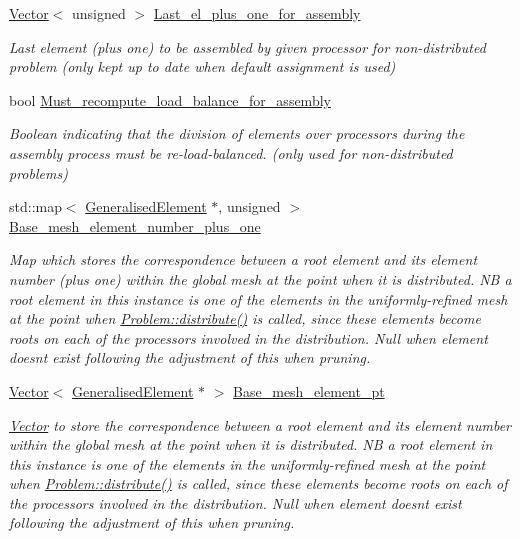 \begin{DoxyCompactItemize}
\hyperlink{classoomph_1_1Vector}{Vector}$<$ unsigned $>$ \hyperlink{classoomph_1_1Problem_a4842a9a213197905b5a8e182a3c02cce}{Last\+\_\+el\+\_\+plus\+\_\+one\+\_\+for\+\_\+assembly}
\begin{DoxyCompactList}\small\item\em Last element (plus one) to be assembled by given processor for non-\/distributed problem (only kept up to date when default assignment is used) \end{DoxyCompactList}\item 
bool \hyperlink{classoomph_1_1Problem_aab187e716f470b32a01d7f0cee7f3bf4}{Must\+\_\+recompute\+\_\+load\+\_\+balance\+\_\+for\+\_\+assembly}
\begin{DoxyCompactList}\small\item\em Boolean indicating that the division of elements over processors during the assembly process must be re-\/load-\/balanced. (only used for non-\/distributed problems) \end{DoxyCompactList}\item 
std\+::map$<$ \hyperlink{classoomph_1_1GeneralisedElement}{Generalised\+Element} $\ast$, unsigned $>$ \hyperlink{classoomph_1_1Problem_a0676b5ce628a0f22f8a7d0330c14d3b4}{Base\+\_\+mesh\+\_\+element\+\_\+number\+\_\+plus\+\_\+one}
\begin{DoxyCompactList}\small\item\em Map which stores the correspondence between a root element and its element number (plus one) within the global mesh at the point when it is distributed. NB a root element in this instance is one of the elements in the uniformly-\/refined mesh at the point when \hyperlink{classoomph_1_1Problem_aa35e1adc0fdf14b217c7b608eb9cf20b}{Problem\+::distribute()} is called, since these elements become roots on each of the processors involved in the distribution. Null when element doesn\textquotesingle{}t exist following the adjustment of this when pruning. \end{DoxyCompactList}\item 
\hyperlink{classoomph_1_1Vector}{Vector}$<$ \hyperlink{classoomph_1_1GeneralisedElement}{Generalised\+Element} $\ast$ $>$ \hyperlink{classoomph_1_1Problem_a74ce6267ea12fd59903b88e316283b6a}{Base\+\_\+mesh\+\_\+element\+\_\+pt}
\begin{DoxyCompactList}\small\item\em \hyperlink{classoomph_1_1Vector}{Vector} to store the correspondence between a root element and its element number within the global mesh at the point when it is distributed. NB a root element in this instance is one of the elements in the uniformly-\/refined mesh at the point when \hyperlink{classoomph_1_1Problem_aa35e1adc0fdf14b217c7b608eb9cf20b}{Problem\+::distribute()} is called, since these elements become roots on each of the processors involved in the distribution. Null when element doesn\textquotesingle{}t exist following the adjustment of this when pruning. \end{DoxyCompactList}\item 

\end{DoxyCompactItemize}

